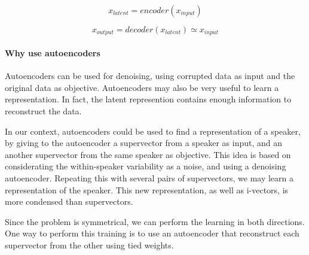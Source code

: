 \documentclass[conference]{IEEEtran}
\begin{document}
\begin{figure}[!h]

    
    \label{autoencoder_structure}
\end{figure}


\begin{equation}
  x_{latent} = encoder(x_{input})
  \label{eq:enc}
\end{equation}

\begin{equation}
  x_{output} = decoder(x_{latent}) \simeq x_{input}
  \label{eq:dec}
\end{equation}


\paragraph{Why use autoencoders}

Autoencoders can be used for denoising, using corrupted data as input and the original data as objective.
Autoencoders may also be very useful to learn a representation. In fact, the latent represention contains enough information to reconstruct the data.

In our context, autoencoders could be used to find a representation of a speaker, by giving to the autoencoder a supervector from a speaker as input, and an another supervector from the same speaker as objective. This idea is based on considerating the within-speaker variability as a noise, and using a denoising autoencoder. Repeating this with several pairs of supervectors, we may learn a representation of the speaker. This new representation, as well as i-vectors, is more condensed than supervectors.

Since the problem is symmetrical, we can perform the learning in both directions. One way to perform this training is to use an autoencoder that reconstruct each supervector from the other using tied weights.
\end{document}
